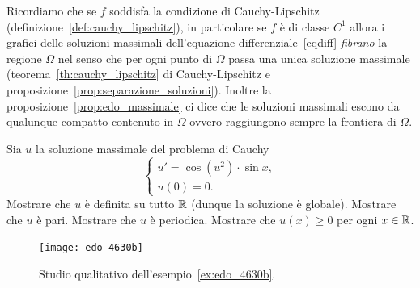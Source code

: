 Ricordiamo che se $f$ soddisfa la condizione di Cauchy-Lipschitz
(definizione~\ref{def:cauchy_lipschitz}), in particolare
se $f$ è di classe $C^1$ allora i grafici delle soluzioni
massimali dell'equazione differenziale~\eqref{eqdiff}
\emph{fibrano} la regione $\Omega$ nel senso che per ogni punto di
$\Omega$ passa una unica soluzione massimale (teorema~\ref{th:cauchy_lipschitz}
di Cauchy-Lipschitz e proposizione~\ref{prop:separazione_soluzioni}).
Inoltre la proposizione~\ref{prop:edo_massimale} ci dice
che le soluzioni massimali escono da qualunque compatto contenuto in
$\Omega$ ovvero raggiungono sempre la frontiera di $\Omega$.

\begin{example}\label{ex:edo_4630b}
Sia $u$ la soluzione massimale del problema di Cauchy
\[
	\begin{cases}
		u' = \cos(u^2)\cdot \sin x, \\
		u(0) = 0.
	\end{cases}
\]
Mostrare che $u$
è definita su tutto ${\mathbb R}$ (dunque la soluzione è globale).
Mostrare che $u$ è pari.
Mostrare che $u$ è periodica.
Mostrare che $u(x)\ge 0$ per ogni $x\in {\mathbb R}$.
\end{example}
\newsavebox{\qredoquattro}
\begin{figure}
  \centering\texttt{[image: edo\_4630b]}
  \caption{Studio qualitativo dell'esempio~\ref{ex:edo_4630b}.
  \ifwidemargin\\\\\fi%
  \usebox{\qredoquattro}}
  \label{fig:edo_4630b}
\end{figure}
%
